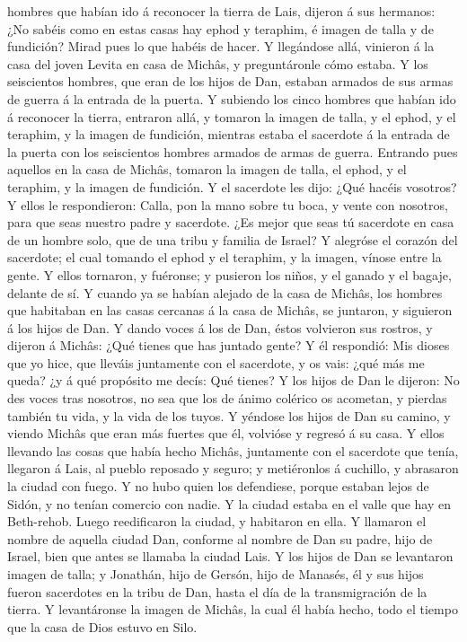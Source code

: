 hombres que habían ido á reconocer la tierra de Lais, dijeron á sus
hermanos: ¿No sabéis como en estas casas hay ephod y teraphim, é imagen
de talla y de fundición? Mirad pues lo que habéis de hacer.
 Y llegándose allá, vinieron á la casa del joven Levita en
casa de Michâs, y preguntáronle cómo estaba.  Y los
seiscientos hombres, que eran de los hijos de Dan, estaban armados de
sus armas de guerra á la entrada de la puerta.  Y subiendo
los cinco hombres que habían ido á reconocer la tierra, entraron allá, y
tomaron la imagen de talla, y el ephod, y el teraphim, y la imagen de
fundición, mientras estaba el sacerdote á la entrada de la puerta con
los seiscientos hombres armados de armas de guerra. 
Entrando pues aquellos en la casa de Michâs, tomaron la imagen de talla,
el ephod, y el teraphim, y la imagen de fundición. Y el sacerdote les
dijo: ¿Qué hacéis vosotros?  Y ellos le respondieron:
Calla, pon la mano sobre tu boca, y vente con nosotros, para que seas
nuestro padre y sacerdote. ¿Es mejor que seas tú sacerdote en casa de un
hombre solo, que de una tribu y familia de Israel?  Y
alegróse el corazón del sacerdote; el cual tomando el ephod y el
teraphim, y la imagen, vínose entre la gente.  Y ellos
tornaron, y fuéronse; y pusieron los niños, y el ganado y el bagaje,
delante de sí.  Y cuando ya se habían alejado de la casa de
Michâs, los hombres que habitaban en las casas cercanas á la casa de
Michâs, se juntaron, y siguieron á los hijos de Dan.  Y
dando voces á los de Dan, éstos volvieron sus rostros, y dijeron á
Michâs: ¿Qué tienes que has juntado gente?  Y él respondió:
Mis dioses que yo hice, que lleváis juntamente con el sacerdote, y os
vais: ¿qué más me queda? ¿y á qué propósito me decís: Qué tienes?
 Y los hijos de Dan le dijeron: No des voces tras nosotros,
no sea que los de ánimo colérico os acometan, y pierdas también tu vida,
y la vida de los tuyos.  Y yéndose los hijos de Dan su
camino, y viendo Michâs que eran más fuertes que él, volvióse y regresó
á su casa.  Y ellos llevando las cosas que había hecho
Michâs, juntamente con el sacerdote que tenía, llegaron á Lais, al
pueblo reposado y seguro; y metiéronlos á cuchillo, y abrasaron la
ciudad con fuego.  Y no hubo quien los defendiese, porque
estaban lejos de Sidón, y no tenían comercio con nadie. Y la ciudad
estaba en el valle que hay en Beth-rehob. Luego reedificaron la ciudad,
y habitaron en ella.  Y llamaron el nombre de aquella
ciudad Dan, conforme al nombre de Dan su padre, hijo de Israel, bien que
antes se llamaba la ciudad Lais.  Y los hijos de Dan se
levantaron imagen de talla; y Jonathán, hijo de Gersón, hijo de Manasés,
él y sus hijos fueron sacerdotes en la tribu de Dan, hasta el día de la
transmigración de la tierra.  Y levantáronse la imagen de
Michâs, la cual él había hecho, todo el tiempo que la casa de Dios
estuvo en Silo.

